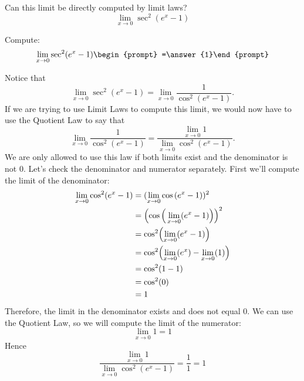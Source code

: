 \documentclass{ximera}
\begin{document}
\begin{question}
  Can this limit be directly computed by limit laws?
  \[
  \lim_{x\to 0}\sec^2(e^x-1)
  \]
  \begin{multipleChoice}
  \end{multipleChoice}
  \begin{question}
    Compute:
    \[
    \lim_{x\to 0}\sec^2(e^x-1)\begin{prompt} =\answer{1}\end{prompt}
    \]
    \begin{feedback}
      Notice that
      \[
      \lim_{x\to 0} \sec^2(e^x-1) = \lim_{x\to 0} \frac{1}{\cos^2(e^x-1)}.
      \]
      If we are trying to use Limit Laws to compute this limit, we
      would now have to use the Quotient Law to say that
      \[
      \lim_{x\to 0} \frac{1}{\cos^2(e^x-1)} = \frac{ \lim_{x\to 0}1}{
        \lim_{x\to 0}\cos^2(e^x-1)}.
      \]
      We are only allowed to use this law if both limits exist and the
      denominator is not $0$.  Let's check the denominator and numerator
      separately. First we'll compute the limit of the denominator:
      \begin{align*}
        \lim_{x\to 0}\cos^2(e^x-1) &= (\lim_{x\to 0}\cos{(e^x-1)})^{2}\\
        &= \Bigl(\cos{\Big(\lim_{x\to 0}(e^x-1)\Bigr)}\Bigr)^{2}\\
        & =\cos^2\Bigl(\lim_{x\to 0}(e^x-1)\Bigr)\\
        &=\cos^2\Bigl(\lim_{x\to 0}(e^x)-\lim_{x\to 0}(1)\Bigr)\\
        &=\cos^2(1-1)\\
        &= \cos^2(0)\\
        &=1
      \end{align*}
      Therefore, the limit in the denominator exists and does not
      equal $0$. We can use the Quotient Law, so we will compute the limit of the numerator:
      \[
      \lim_{x\to 0}1=1
      \]
      Hence
      \[
      \frac{ \lim_{x\to 0}1}{ \lim_{x\to 0}\cos^2(e^x-1)} =
      \frac{1}{1}=1
      \]
    \end{feedback}
  \end{question}
\end{question}
\end{document}
